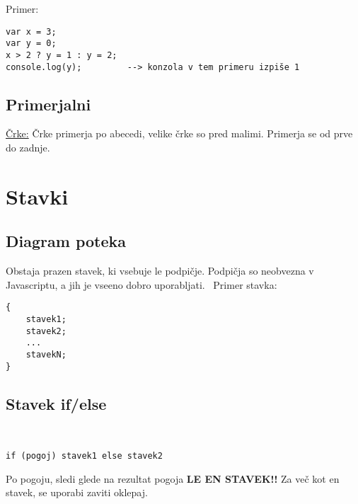 Primer:\begin{verbatim}
var x = 3;
var y = 0;
x > 2 ? y = 1 : y = 2;
console.log(y);			--> konzola v tem primeru izpiše 1
\end{verbatim}

\subsection{Primerjalni}
\underline{Črke:}
Črke primerja po abecedi, velike črke so pred malimi. Primerja se od prve do zadnje.


\section{Stavki}

\subsection*{Diagram poteka}


Obstaja prazen stavek, ki vsebuje le podpičje. Podpičja so neobvezna v Javascriptu, a jih je vseeno dobro uporabljati.\
\newpage
Primer stavka:
\begin{verbatim}
{
	stavek1;
	stavek2;
	...
	stavekN;	
}
\end{verbatim}
\subsection{Stavek if/else}\
\begin{verbatim}
if (pogoj) stavek1 else stavek2
\end{verbatim}
Po pogoju, sledi glede na rezultat pogoja \textbf{LE EN STAVEK!!} Za več kot en stavek, se uporabi zaviti oklepaj.\

